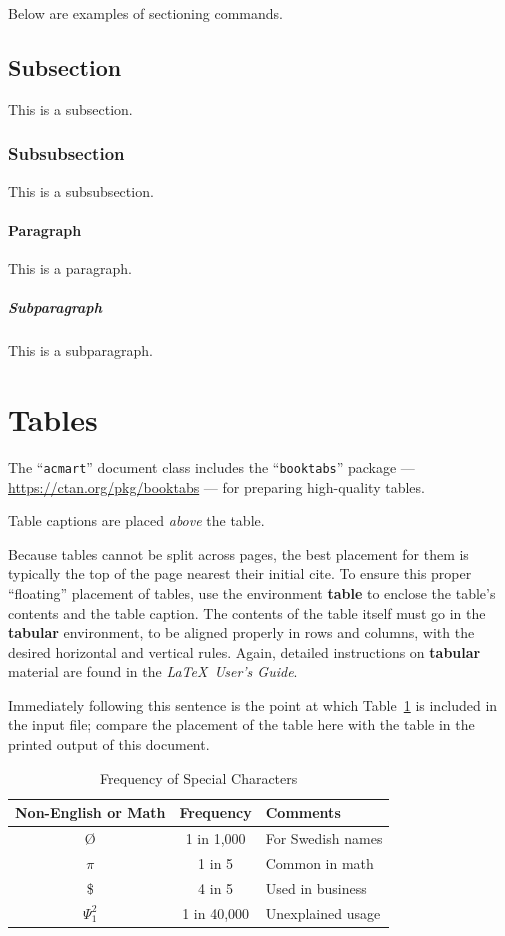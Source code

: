 Below are examples of sectioning commands.

\subsection{Subsection}
\label{sec:subsection}

This is a subsection.

\subsubsection{Subsubsection}
\label{sec:subsubsection}

This is a subsubsection.

\paragraph{Paragraph}

This is a paragraph.

\subparagraph{Subparagraph}

This is a subparagraph.

\section{Tables}

The ``\verb|acmart|'' document class includes the ``\verb|booktabs|''
package --- \url{https://ctan.org/pkg/booktabs} --- for preparing
high-quality tables.

Table captions are placed {\itshape above} the table.

Because tables cannot be split across pages, the best placement for
them is typically the top of the page nearest their initial cite.  To
ensure this proper ``floating'' placement of tables, use the
environment \textbf{table} to enclose the table's contents and the
table caption.  The contents of the table itself must go in the
\textbf{tabular} environment, to be aligned properly in rows and
columns, with the desired horizontal and vertical rules.  Again,
detailed instructions on \textbf{tabular} material are found in the
\textit{\LaTeX\ User's Guide}.

Immediately following this sentence is the point at which
Table~\ref{tab:freq} is included in the input file; compare the
placement of the table here with the table in the printed output of
this document.

\begin{table}
  \caption{Frequency of Special Characters}
  \label{tab:freq}
  \begin{tabular}{ccl}
    \toprule
    Non-English or Math&Frequency&Comments\\
    \midrule
    \O & 1 in 1,000& For Swedish names\\
    $\pi$ & 1 in 5& Common in math\\
    \$ & 4 in 5 & Used in business\\
    $\Psi^2_1$ & 1 in 40,000& Unexplained usage\\
  \bottomrule
\end{tabular}
\end{table}

